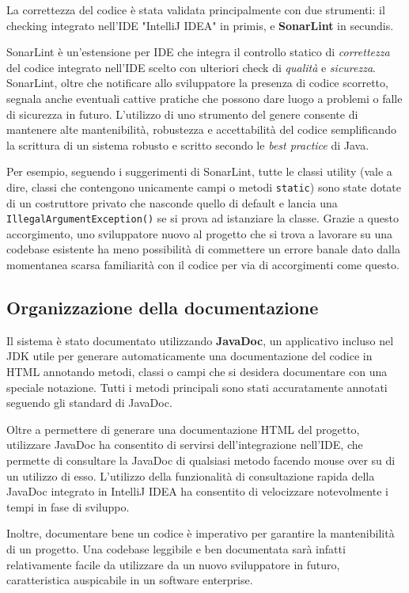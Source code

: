 \documentclass{article}
\begin{document}
La correttezza del codice è stata validata principalmente con due strumenti: il checking integrato nell'IDE "IntelliJ IDEA" in primis, e \textbf{SonarLint} in secundis.

SonarLint è un'estensione per IDE che integra il controllo statico di \textit{correttezza} del codice integrato nell'IDE scelto con ulteriori check di \textit{qualità} e \textit{sicurezza}. SonarLint, oltre che notificare allo sviluppatore la presenza di codice scorretto, segnala anche eventuali cattive pratiche che possono dare luogo a problemi o falle di sicurezza in futuro. L'utilizzo di uno strumento del genere consente di mantenere alte mantenibilità, robustezza e accettabilità del codice semplificando la scrittura di un sistema robusto e scritto secondo le \textit{best practice} di Java.

Per esempio, seguendo i suggerimenti di SonarLint, tutte le classi utility (vale a dire, classi che contengono unicamente campi o metodi \texttt{static}) sono state dotate di un costruttore privato che nasconde quello di default e lancia una \texttt{IllegalArgumentException()} se si prova ad istanziare la classe. Grazie a questo accorgimento, uno sviluppatore nuovo al progetto che si trova a lavorare su una codebase esistente ha meno possibilità di commettere un errore banale dato dalla momentanea scarsa familiarità con il codice per via di accorgimenti come questo.

\subsection{Organizzazione della documentazione}

Il sistema è stato documentato utilizzando \textbf{JavaDoc}, un applicativo incluso nel JDK utile per generare automaticamente una documentazione del codice in HTML annotando metodi, classi o campi che si desidera documentare con una speciale notazione. Tutti i metodi principali sono stati accuratamente annotati seguendo gli standard di JavaDoc.

Oltre a permettere di generare una documentazione HTML del progetto, utilizzare JavaDoc ha consentito di servirsi dell'integrazione nell'IDE, che permette di consultare la JavaDoc di qualsiasi metodo facendo mouse over su di un utilizzo di esso. L'utilizzo della funzionalità di consultazione rapida della JavaDoc integrato in IntelliJ IDEA ha consentito di velocizzare notevolmente i tempi in fase di sviluppo.

Inoltre, documentare bene un codice è imperativo per garantire la mantenibilità di un progetto. Una codebase leggibile e ben documentata sarà infatti relativamente facile da utilizzare da un nuovo sviluppatore in futuro, caratteristica auspicabile in un software enterprise.
\end{document}
